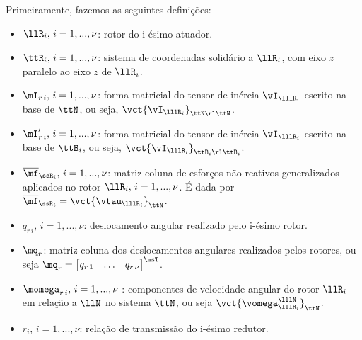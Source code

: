 \documentclass[]{politex}
\begin{document}
Primeiramente, fazemos as seguintes definições:
\begin{itemize}
\item $\llR_i, \,i=1,...,\nu$: rotor do i-ésimo atuador.
\item $\ttR_i, \,i=1,...,\nu$: sistema de coordenadas solidário a $\llR_i$, com eixo $z$ paralelo ao eixo $z$ de $\llR_i$.
\item $\mI_{r \,i}, \,i=1,...,\nu$: forma matricial do tensor de inércia $\vI_{\lllR_i}$ escrito na base de $\ttN$, ou seja, $\vct{\vI_{\lllR_i}}_{\ttN \rl \ttN}$.
\item $\mI'_{r \,i}, \,i=1,...,\nu$: forma matricial do tensor de inércia $\vI_{\lllR_i}$ escrito na base de $\ttB_i$, ou seja, $\vct{\vI_{\lllR_i}}_{\ttB_i \rl \ttB_i}$.
\item $\overline{\mf}_{\ssR_i}, \,i=1,...,\nu$: matriz-coluna de esforços não-reativos generalizados aplicados no rotor $\llR_{i}, \,i=1,...,\nu$. É dada por $\overline{\mf}_{\ssR_i} = \vct{\vtau_{\lllR_i}}_\ttN $.
\item $q_{r\,i}, \,i=1,...,\nu$: deslocamento angular realizado pelo i-ésimo rotor.
\item $\mq_r$: matriz-coluna dos deslocamentos angulares realizados pelos rotores, ou seja $\mq_r = \begin{bmatrix} q_{r\,1} & \hdots & q_{r\,\nu}  \end{bmatrix}^\msT$.
\item $\momega_{r \,i}, \,i=1,...,\nu$ : componentes de velocidade angular do rotor $\llR_i$ em relação a $\llN$ no sistema $\ttN$, ou seja $\vct{\vomega_{\lllR_i}^{\lllN} }_{\ttN} $.
\item $r_i, \,i=1,...,\nu$: relação de transmissão do i-ésimo redutor.

\end{itemize}
\end{document}
